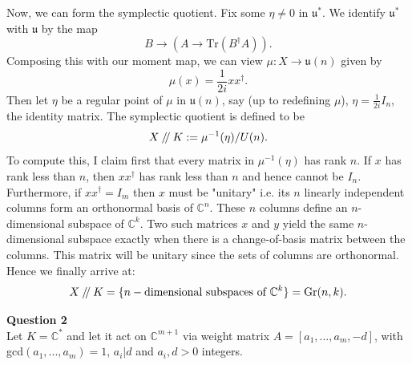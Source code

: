 \documentclass{article}
\newcommand{\C}{\mathbb{C}}
\newcommand{\sslash}{\mathbin{/\mkern-4mu/}}
\newcommand{\Tr}{\mathrm{Tr}}
\begin{document}
Now, we can form the symplectic quotient. Fix some $\eta \neq 0$ in $\mathfrak{u}^\ast$. We identify $\mathfrak{u}^\ast$ with $\mathfrak{u}$ by the map
\begin{equation}
	B \to (A\to \Tr(B^\dagger A)).
\end{equation}
Composing this with our moment map, we can view $\mu:X\to \mathfrak{u}(n)$ given by
$$\mu(x) = \frac{1}{2i}xx^\dagger.$$
Then let $\eta$ be a regular point of $\mu$ in $ \mathfrak{u}(n)$, say (up to redefining $\mu$), $\eta=\frac{1}{2i}I_n$, the identity matrix. The symplectic quotient is defined to be
$$X\sslash K := \mu^{-1}(\eta)/U(n).$$
To compute this, I claim first that every matrix in $\mu^{-1}(\eta)$ has rank $n$. If $x$ has rank less than $n$, then $xx^\dagger$ has rank less than $n$ and hence cannot be $I_n$. Furthermore, if $xx^\dagger = I_m$ then $x$ must be "unitary" i.e. its $n$ linearly independent columns form an orthonormal basis of $\C^n$. These $n$ columns define an $n$-dimensional subspace of $\C^k$. Two such matrices $x$ and $y$ yield the same $n$-dimensional subspace exactly when there is a change-of-basis matrix between the columns. This matrix will be unitary since the sets of columns are orthonormal. Hence we finally arrive at:
$$X\sslash K = \{n-\text{dimensional subspaces of }\C^k\} = \mathrm{Gr}(n,k).$$

\pagebreak

\noindent \textbf{Question 2} \\
 Let $K = \C^\ast$ and let it act on $\C^{m+1}$ via weight matrix $A=[a_1,...,a_m,-d]$, with gcd$(a_1,...,a_m)=1$, $a_i | d$ and $a_i,d > 0$ integers. \vspace{1em}
\end{document}
